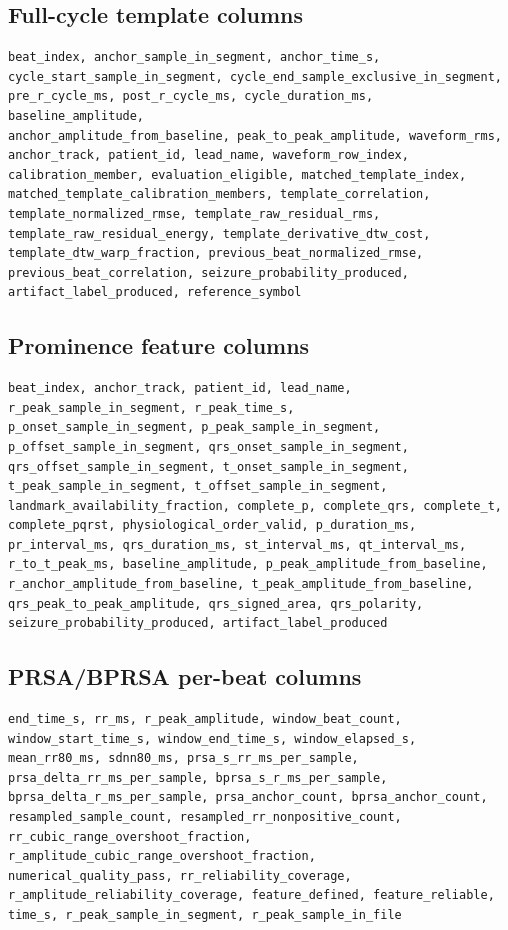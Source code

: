\documentclass[11pt,a4paper]{article}
\begin{document}
\subsection{Full-cycle template columns}

\begin{lstlisting}
beat_index, anchor_sample_in_segment, anchor_time_s,
cycle_start_sample_in_segment, cycle_end_sample_exclusive_in_segment,
pre_r_cycle_ms, post_r_cycle_ms, cycle_duration_ms, baseline_amplitude,
anchor_amplitude_from_baseline, peak_to_peak_amplitude, waveform_rms,
anchor_track, patient_id, lead_name, waveform_row_index,
calibration_member, evaluation_eligible, matched_template_index,
matched_template_calibration_members, template_correlation,
template_normalized_rmse, template_raw_residual_rms,
template_raw_residual_energy, template_derivative_dtw_cost,
template_dtw_warp_fraction, previous_beat_normalized_rmse,
previous_beat_correlation, seizure_probability_produced,
artifact_label_produced, reference_symbol
\end{lstlisting}

\subsection{Prominence feature columns}

\begin{lstlisting}
beat_index, anchor_track, patient_id, lead_name,
r_peak_sample_in_segment, r_peak_time_s,
p_onset_sample_in_segment, p_peak_sample_in_segment,
p_offset_sample_in_segment, qrs_onset_sample_in_segment,
qrs_offset_sample_in_segment, t_onset_sample_in_segment,
t_peak_sample_in_segment, t_offset_sample_in_segment,
landmark_availability_fraction, complete_p, complete_qrs, complete_t,
complete_pqrst, physiological_order_valid, p_duration_ms,
pr_interval_ms, qrs_duration_ms, st_interval_ms, qt_interval_ms,
r_to_t_peak_ms, baseline_amplitude, p_peak_amplitude_from_baseline,
r_anchor_amplitude_from_baseline, t_peak_amplitude_from_baseline,
qrs_peak_to_peak_amplitude, qrs_signed_area, qrs_polarity,
seizure_probability_produced, artifact_label_produced
\end{lstlisting}

\subsection{PRSA/BPRSA per-beat columns}

\begin{lstlisting}
end_time_s, rr_ms, r_peak_amplitude, window_beat_count,
window_start_time_s, window_end_time_s, window_elapsed_s,
mean_rr80_ms, sdnn80_ms, prsa_s_rr_ms_per_sample,
prsa_delta_rr_ms_per_sample, bprsa_s_r_ms_per_sample,
bprsa_delta_r_ms_per_sample, prsa_anchor_count, bprsa_anchor_count,
resampled_sample_count, resampled_rr_nonpositive_count,
rr_cubic_range_overshoot_fraction,
r_amplitude_cubic_range_overshoot_fraction,
numerical_quality_pass, rr_reliability_coverage,
r_amplitude_reliability_coverage, feature_defined, feature_reliable,
time_s, r_peak_sample_in_segment, r_peak_sample_in_file
\end{lstlisting}
\end{document}
